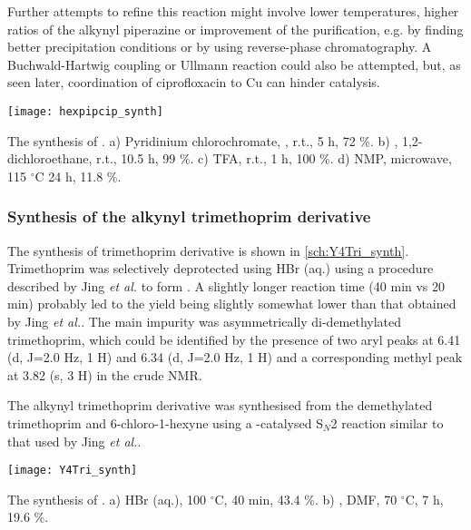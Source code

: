 Further attempts to refine this reaction might involve lower temperatures, higher ratios of the alkynyl piperazine  or improvement of the purification, e.g. by finding better precipitation conditions or by using reverse-phase chromatography. A Buchwald-Hartwig coupling or Ullmann reaction could also be attempted, but, as seen later, coordination of ciprofloxacin to Cu can hinder catalysis.

\begin{scheme}[H]
	\begin{center}
		\texttt{[image: hexpipcip\_synth]}
		\caption{The synthesis of . 
		a) Pyridinium chlorochromate, , r.t., 5 h, 72 \%.
		b) , 1,2-dichloroethane, r.t., 10.5 h, 99 \%.
		c) TFA, r.t., 1 h, 100 \%.
		d) NMP, microwave, 115 $^{\circ}$C 24 h, 11.8 \%.
		\label{sch:Y4Cip_synth}}
	\end{center}
\end{scheme}

\subsubsection{Synthesis of the alkynyl trimethoprim derivative }

The synthesis of trimethoprim derivative  is shown in \ref{sch:Y4Tri_synth}. Trimethoprim was selectively deprotected using HBr (aq.) using a procedure described by Jing \textit{et al.}\cite{Jing2013} to form . A slightly longer reaction time (40 min vs 20 min) probably led to the yield being slightly somewhat lower than that obtained by Jing \textit{et al.}. 
The main impurity was asymmetrically di-demethylated trimethoprim, which could be identified by the presence of two aryl peaks at 6.41 (d, J=2.0 Hz, 1 H) and 6.34 (d, J=2.0 Hz, 1 H) and a corresponding methyl peak at 3.82 (s, 3 H) in the crude NMR.

The alkynyl trimethoprim derivative  was synthesised from the demethylated trimethoprim  and 6-chloro-1-hexyne  using a -catalysed S$_N$2 reaction similar to that used by Jing \textit{et al.}.

\begin{scheme}[H]
	\begin{center}
		\texttt{[image: Y4Tri\_synth]}
		\caption{The synthesis of .
		a) HBr (aq.), 100 $^{\circ}$C, 40 min, 43.4 \%. 
		b) , DMF, 70 $^{\circ}$C, 7 h, 19.6 \%.
		\label{sch:Y4Tri_synth}}
	\end{center}
\end{scheme}

